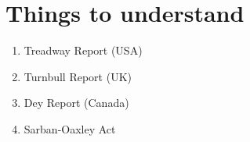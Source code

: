 \chapter{Things to understand}

\begin{enumerate}
	\item Treadway Report (USA)
	\item Turnbull Report (UK)
	\item Dey Report (Canada)
	\item Sarban-Oaxley Act
\end{enumerate}